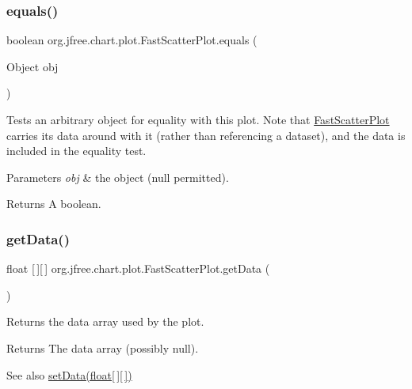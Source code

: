 \subsubsection{\texorpdfstring{equals()}{equals()}}
{\footnotesize\ttfamily boolean org.\+jfree.\+chart.\+plot.\+Fast\+Scatter\+Plot.\+equals (\begin{DoxyParamCaption}\item[{Object}]{obj }\end{DoxyParamCaption})}

Tests an arbitrary object for equality with this plot. Note that {\ttfamily \mbox{\hyperlink{classorg_1_1jfree_1_1chart_1_1plot_1_1_fast_scatter_plot}{Fast\+Scatter\+Plot}}} carries its data around with it (rather than referencing a dataset), and the data is included in the equality test.


\begin{DoxyParams}{Parameters}
{\em obj} & the object ({\ttfamily null} permitted).\\
\hline
\end{DoxyParams}
\begin{DoxyReturn}{Returns}
A boolean. 
\end{DoxyReturn}
\mbox{\label{classorg_1_1jfree_1_1chart_1_1plot_1_1_fast_scatter_plot_a0c23b75056c021aac92afb38266d906b}} 
\subsubsection{\texorpdfstring{get\+Data()}{getData()}}
{\footnotesize\ttfamily float \mbox{[}$\,$\mbox{]}\mbox{[}$\,$\mbox{]} org.\+jfree.\+chart.\+plot.\+Fast\+Scatter\+Plot.\+get\+Data (\begin{DoxyParamCaption}{ }\end{DoxyParamCaption})}

Returns the data array used by the plot.

\begin{DoxyReturn}{Returns}
The data array (possibly {\ttfamily null}).
\end{DoxyReturn}
\begin{DoxySeeAlso}{See also}
\mbox{\hyperlink{classorg_1_1jfree_1_1chart_1_1plot_1_1_fast_scatter_plot_ab952cb15304cfe4f550ed9a57134c752}{set\+Data(float\mbox{[}$\,$\mbox{]}\mbox{[}$\,$\mbox{]})}} 
\end{DoxySeeAlso}
\mbox{\label{classorg_1_1jfree_1_1chart_1_1plot_1_1_fast_scatter_plot_ac8cbf1df42548efb7ec92d0c148ab496}} 
